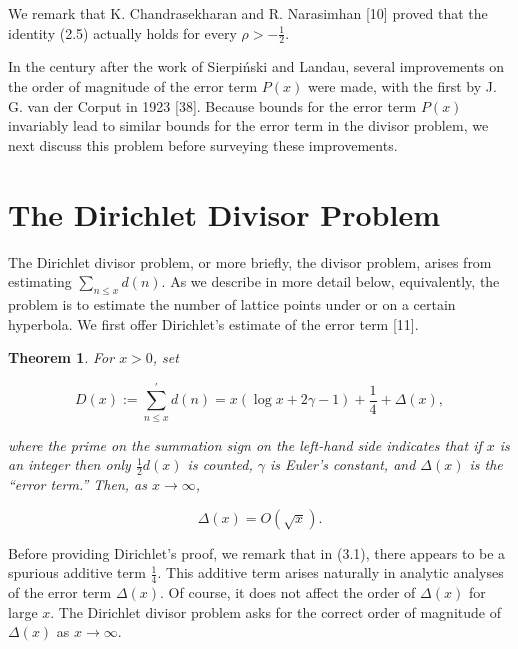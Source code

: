 \documentclass[10pt]{article}
\theoremstyle{plain}
\newtheorem{theorem}{Theorem}
\begin{document}
We remark that K. Chandrasekharan and R. Narasimhan [10] proved that the identity (2.5) actually holds for every $\rho>-\frac{1}{2}$.

In the century after the work of Sierpiński and Landau, several improvements on the order of magnitude of the error term $P(x)$ were made, with the first by J. G. van der Corput in 1923 [38]. Because bounds for the error term $P(x)$ invariably lead to similar bounds for the error term in the divisor problem, we next discuss this problem before surveying these improvements.

\section{The Dirichlet Divisor Problem}

The Dirichlet divisor problem, or more briefly, the divisor problem, arises from estimating $\sum_{n \leq x} d(n)$. As we describe in more detail below, equivalently, the problem is to estimate the number of lattice points under or on a certain hyperbola. We first offer Dirichlet's estimate of the error term [11].

\begin{theorem}
For $x>0$, set


\begin{equation*}
D(x):=\sum_{n \leq x}^{\prime} d(n)=x(\log x+2 \gamma-1)+\frac{1}{4}+\Delta(x), \tag{3.1}
\end{equation*}


where the prime on the summation sign on the left-hand side indicates that if $x$ is an integer then only $\frac{1}{2} d(x)$ is counted, $\gamma$ is Euler's constant, and $\Delta(x)$ is the ``error term.'' Then, as $x \to \infty$,


\begin{equation*}
\Delta(x)=O(\sqrt{x}). \tag{3.2}
\end{equation*}
\end{theorem}

Before providing Dirichlet's proof, we remark that in (3.1), there appears to be a spurious additive term $\frac{1}{4}$. This additive term arises naturally in analytic analyses of the error term $\Delta(x)$. Of course, it does not affect the order of $\Delta(x)$ for large $x$. The Dirichlet divisor problem asks for the correct order of magnitude of $\Delta(x)$ as $x \to \infty$.
\end{document}
